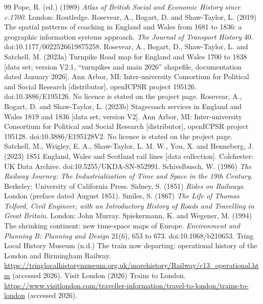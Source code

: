 \documentclass[11pt,a4paper]{article}
\begin{document}
\begin{thebibliography}{99}
 Pope, R. (ed.) (1989) \textit{Atlas of British Social and Economic History since c.1700}. London: Routledge.
 Rosevear, A., Bogart, D. and Shaw-Taylor, L. (2019) The spatial patterns of coaching in England and Wales from 1681 to 1836: a geographic information systems approach. \textit{The Journal of Transport History} 40. doi:10.1177/0022526619875258.
 Rosevear, A., Bogart, D., Shaw-Taylor, L. and Satchell, M. (2023a) Turnpike Road map for England and Wales 1700 to 1838 [data set; version V2.1, ``turnpikes and main 2026'' shapefile, documentation dated January 2026]. Ann Arbor, MI: Inter-university Consortium for Political and Social Research [distributor], openICPSR project 195126. doi:10.3886/E195126. No licence is stated on the project page.
 Rosevear, A., Bogart, D. and Shaw-Taylor, L. (2023b) Stagecoach services in England and Wales 1819 and 1836 [data set, version V2]. Ann Arbor, MI: Inter-university Consortium for Political and Social Research [distributor], openICPSR project 195128. doi:10.3886/E195128V2. No licence is stated on the project page.
 Satchell, M., Wrigley, E. A., Shaw-Taylor, L. M. W., You, X. and Henneberg, J. (2023) 1851 England, Wales and Scotland rail lines [data collection]. Colchester: UK Data Archive. doi:10.5255/UKDA-SN-852991.
 Schivelbusch, W. (1986) \textit{The Railway Journey: The Industrialization of Time and Space in the 19th Century}. Berkeley: University of California Press.
 Sidney, S. (1851) \textit{Rides on Railways}. London (preface dated August 1851).
 Smiles, S. (1867) \textit{The Life of Thomas Telford, Civil Engineer, with an Introductory History of Roads and Travelling in Great Britain}. London: John Murray.
 Spiekermann, K. and Wegener, M. (1994) The shrinking continent: new time-space maps of Europe. \textit{Environment and Planning B: Planning and Design} 21(6), 653 to 673. doi:10.1068/b210653.
 Tring Local History Museum (n.d.) The train now departing: operational history of the London and Birmingham Railway. \url{https://tringlocalhistorymuseum.org.uk/morehistory/Railway/c13_operational.htm} (accessed 2026).
 Visit London (2026) Trains to London. \url{https://www.visitlondon.com/traveller-information/travel-to-london/trains-to-london} (accessed 2026).

\end{thebibliography}
\end{document}
